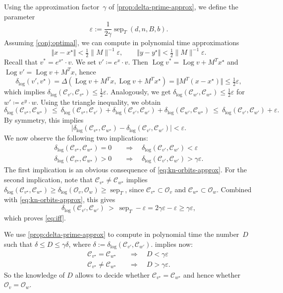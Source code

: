 \documentclass[10pt,a4paper]{article}
\theoremstyle{definition}
\DeclareMathOperator{\sep}{sep}
\DeclareMathOperator{\Log}{Log}
\newcommand{\distLD}{\delta_{\log}}
\newcommand{\OO}{\ensuremath{\mathcal{O}}}
\newcommand{\KK}{\ensuremath{\mathcal{C}}}
\numberwithin{equation}{section}
\begin{document}
Using the approximation factor~$\gamma$ of \cref{prop:delta-prime-approx}, we define the parameter
$$
 \varepsilon :=\frac{1}{2\gamma} \sep_T(d,n,B,b) .
$$
Assuming \cref{conj:optimal}, we can compute in polynomial time approximations
\[
    \Vert x - x^\star \Vert <  \tfrac12\|M\|^{-1} \varepsilon, \qquad
    \Vert y-y^\star\Vert < \tfrac12\|M\|^{-1} \varepsilon . %
\]
Recall that  $v^\ast = e^{x^\star}\cdot v$. We set $v'\coloneqq e^x\cdot v$. Then
$\Log v^\ast = \Log v + M^Tx^\star$ and $\Log v' = \Log v + M^Tx$, hence
$$
 \distLD(v',v^\star) = \Delta(\Log v + M^T x , \Log v + M^T x^\star) =\Vert M^T(x-x^\star)\Vert
     \leq \tfrac12 \varepsilon ,
$$
which implies
$\distLD(\KK_{v'},\KK_{v^\star}) \le \tfrac12 \varepsilon$.
Analogously, we get
$\distLD(\KK_{w'},\KK_{w^\star}) \le \tfrac12 \varepsilon$
for $w'\coloneqq e^y\cdot w$.
Using the triangle inequality, we obtain
$$
 \distLD(\KK_{v^\star},\KK_{w^\star}) \ \le\ \distLD(\KK_{v^\star},\KK_{v'}) + \distLD(\KK_{v'},\KK_{w'}) + \distLD(\KK_{w'},\KK_{w^\star})
  \ \le\ \distLD(\KK_{v'},\KK_{w'}) + \varepsilon .
$$
By symmetry, this implies
\begin{equation} \label{eq:kn-orbits-approx}
     \big| \distLD(\KK_{v^\star},\KK_{w^\star}) - \distLD(\KK_{v'},\KK_{w'})\big| < \varepsilon .
\end{equation}
We now observe the following two implications:
\begin{equation}\label{eq:iff}
\begin{split}
     \distLD(\KK_{v^\star},\KK_{w^\star}) = 0\quad & \Longrightarrow \quad \distLD(\KK_{v'},\KK_{w'}) < \varepsilon\\
      \distLD(\KK_{v^\star},\KK_{w^\star}) > 0\quad & \Longrightarrow \quad \distLD(\KK_{v'},\KK_{w'}) > \gamma \varepsilon .
\end{split}
\end{equation}
The first implication is an obvious consequence of \cref{eq:kn-orbits-approx}.
For the second implication, note that
$\KK_{v^\star} \ne \KK_{w^\star}$ implies
$\distLD(\KK_{v^\star},\KK_{w^\star}) \ge \distLD(\OO_{v},\OO_{w}) \ge \sep_T$,
since $\KK_{v^\star} \subset \OO_v$ and $\KK_{w^\star} \subset \OO_w$.
Combined with \cref{eq:kn-orbits-approx}, this gives
$$
 \distLD(\KK_{v'},\KK_{w'}) \ >\  \sep_T  - \varepsilon = 2\gamma \varepsilon  - \varepsilon \ge  \gamma \varepsilon ,
$$
which proves \cref{eq:iff}.

We use \cref{prop:delta-prime-approx} to compute in polynomial time the number~$D$ such that
$\delta \leq D \leq \gamma \delta$, where $\delta:=\distLD (\KK_{v'} , \KK_{w'})$.
 implies now:
\begin{equation*}
\begin{split}
     \KK_{v^\star}= \KK_{w^\star}\quad & \Longrightarrow \quad   D < \gamma\varepsilon\\
     \KK_{v^\star}\ne \KK_{w^\star}\quad & \Longrightarrow \quad D > \gamma\varepsilon .
\end{split}
\end{equation*}
So the knowledge of $D$ allows to decide whether $\KK_{v^\star}= \KK_{w^\star}$
and hence whether $\OO_{v}= \OO_{w}$.
\end{document}
